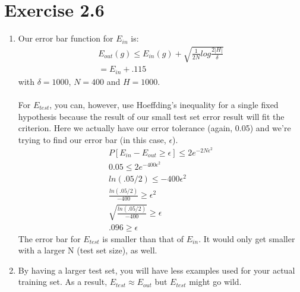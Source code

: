 \documentclass[12pt]{article}
\begin{document}
\section*{Exercise 2.6}
\begin{enumerate}[label=(\alph*)]
	\item Our error bar function for $E_{in}$ is:
	\begin{gather*}
		E_{out}(g) \le E_{in}(g) + \sqrt{\frac{1}{2N}log\frac{2|H|}{\delta}}
		\\ = E_{in} + \boldsymbol{.115}
	\end{gather*}
	with $\delta = 1000$, $N = 400$ and $H = 1000$.
	\\ \\ For $E_{test}$, you can, however, use Hoeffding's inequality for a single fixed hypothesis because the result of our small test set error result will fit the criterion. Here we actually have our error tolerance (again, 0.05) and we're trying to find our error bar (in this case, $\epsilon$).
	\begin{gather*}
		P[E_{in} - E_{out} \ge \epsilon] \le 2e^{-2N\epsilon^2}
		\\ 0.05 \le 2e^{-400\epsilon^2}
		\\ ln(.05/2) \le -400\epsilon^2
		\\ \frac{ln(.05/2)}{-400} \ge \epsilon^2
		\\ \sqrt{\frac{ln(.05/2)}{-400}} \ge \epsilon
		\\ \boldsymbol{.096} \ge \epsilon 
	\end{gather*}
	The error bar for $E_{test}$ is smaller than that of $E_{in}$. It would only get smaller with a larger N (test set size), as well.
	\item By having a larger test set, you will have less examples used for your actual training set. As a result, $E_{test} \approx E_{out}$ but $E_{test}$ might go wild.
\end{enumerate}
\end{document}
